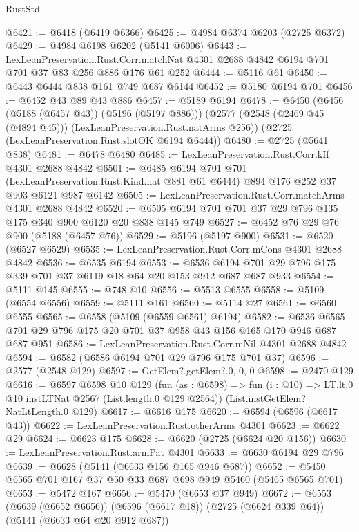 \begin{lexlean}{RustStd}
\begin{coremodule}
@6421 := @6418 (@6419 @6366)
@6425 := @4984 @6374 @6203 (@2725 @6372)
@6429 := @4984 @6198 @6202 (@5141 @6006)
@6443 := LexLeanPreservation.Rust.Corr.matchNat
    @4301
    @2688
    @4842
    @6194
    @701
    @701
    @37
    @83
    @256
    @886
    @176
    @61
    @252
@6444 := @5116 @61
@6450 := @6443 @6444 @838 @161 @749 @687 @6144
@6452 := @5180 @6194 @701
@6456 := @6452 @43 @89 @43 @886
@6457 := @5189 @6194
@6478 := @6450
    (@6456 (@5188 (@6457 @43)) (@5196 (@5197 @886)))
    (@2577 (@2548 (@2469 @45 (@4894 @45))) (LexLeanPreservation.Rust.natArms @256))
    (@2725 (LexLeanPreservation.Rust.slotOK @6194 @6444))
@6480 := @2725 (@5641 @838)
@6481 := @6478 @6480
@6485 := LexLeanPreservation.Rust.Corr.kIf @4301 @2688 @4842
@6501 := @6485
    @6194
    @701
    @701
    (LexLeanPreservation.Rust.Kind.nat @881 @61 @6444)
    @894
    @176
    @252
    @37
    @903
    @6121
    @987
    @6142
@6505 := LexLeanPreservation.Rust.Corr.matchArms @4301 @2688 @4842
@6520 := @6505 @6194 @701 @701 @37 @29 @796 @135 @175 @340 @900 @6120 @20 @838 @145 @749
@6527 := @6452 @76 @29 @76 @900 (@5188 (@6457 @76))
@6529 := @5196 (@5197 @900)
@6531 := @6520 (@6527 @6529)
@6535 := LexLeanPreservation.Rust.Corr.mCons @4301 @2688 @4842
@6536 := @6535 @6194
@6553 := @6536 @6194 @701 @29 @796 @175 @339 @701 @37 @6119 @18 @64 @20 @153 @912 @687 @687 @933
@6554 := @5111 @145
@6555 := @748 @10
@6556 := @5513 @6555
@6558 := @5109 (@6554 @6556)
@6559 := @5111 @161
@6560 := @5114 @27
@6561 := @6560 @6555
@6565 := @6558 (@5109 (@6559 @6561) @6194)
@6582 := @6536 @6565 @701 @29 @796 @175 @20 @701 @37 @958 @43 @156 @165 @170 @946 @687 @687 @951
@6586 := LexLeanPreservation.Rust.Corr.mNil @4301 @2688 @4842
@6594 := @6582 (@6586 @6194 @701 @29 @796 @175 @701 @37)
@6596 := @2577 (@2548 @129)
@6597 := GetElem?.getElem?.{0, 0, 0}
@6598 := @2470 @129
@6616 := @6597
    @6598
    @10
    @129
    (fun (as : @6598) =>
    fun (i : @10) => LT.lt.{0} @10 instLTNat @2567 (List.length.{0} @129 @2564))
    (List.instGetElem?NatLtLength.{0} @129)
@6617 := @6616 @175
@6620 := @6594 (@6596 (@6617 @43))
@6622 := LexLeanPreservation.Rust.otherArms @4301
@6623 := @6622 @29
@6624 := @6623 @175
@6628 := @6620 (@2725 (@6624 @20 @156))
@6630 := LexLeanPreservation.Rust.armPat @4301
@6633 := @6630 @6194 @29 @796
@6639 := @6628 (@5141 (@6633 @156 @165 @946 @687))
@6652 := @5450 @6565 @701 @167 @37 @50 @33 @687 @698 @949 @5460 (@5465 @6565 @701)
@6653 := @5472 @167
@6656 := @5470 (@6653 @37 @949)
@6672 := @6553
    (@6639 (@6652 @6656))
    (@6596 (@6617 @18))
    (@2725 (@6624 @339 @64))
    (@5141 (@6633 @64 @20 @912 @687))

\end{coremodule}
\end{lexlean}
